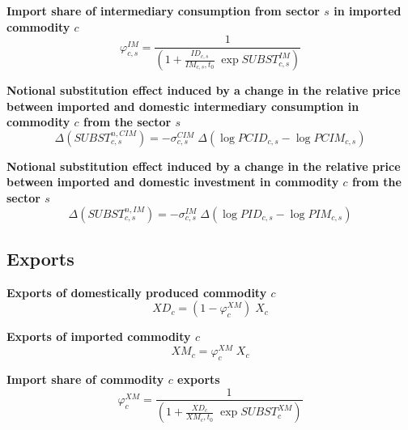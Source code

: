 \documentclass[12pt]{article}
\numberwithin{equation}{section}
\begin{document}
\noindent\textbf{Import share of intermediary consumption from sector $s$ in imported commodity $c$} \\
\begin{dmath}
\varphi^{IM}_{c, s} = \frac{1}{\left( 1 + \frac{ID_{c, s}}{IM_{c, s}, t_{0}} \; \operatorname{exp} SUBST^{IM}_{c, s} \right)}
\end{dmath}

\noindent\textbf{Notional substitution effect induced by a change in the relative price between imported and domestic intermediary consumption in commodity $c$ from the sector $s$} \\
\begin{dmath}
\varDelta \left(SUBST^{n,CIM}_{c, s}\right) = -\sigma^{CIM}_{c, s} \; \varDelta \left(\operatorname{log} PCID_{c, s} - \operatorname{log} PCIM_{c, s}\right)
\end{dmath}

\noindent\textbf{Notional substitution effect induced by a change in the relative price between imported and domestic investment in commodity $c$ from the sector $s$} \\
\begin{dmath}
\varDelta \left(SUBST^{n,IM}_{c, s}\right) = -\sigma^{IM}_{c, s} \; \varDelta \left(\operatorname{log} PID_{c, s} - \operatorname{log} PIM_{c, s}\right)
\end{dmath}





\subsection{Exports}


\noindent\textbf{Exports of domestically produced commodity $c$} \\
\begin{dmath}
XD_{c} = \left( 1 - \varphi^{XM}_{c} \right) \; X_{c}
\end{dmath}

\noindent\textbf{Exports of imported commodity $c$} \\
\begin{dmath}
XM_{c} = \varphi^{XM}_{c} \; X_{c}
\end{dmath}

\noindent\textbf{Import share of commodity $c$ exports} \\
\begin{dmath}
\varphi^{XM}_{c} = \frac{1}{\left( 1 + \frac{XD_{c}}{XM_{c}, t_{0}} \; \operatorname{exp} SUBST^{XM}_{c} \right)}
\end{dmath}
\end{document}
